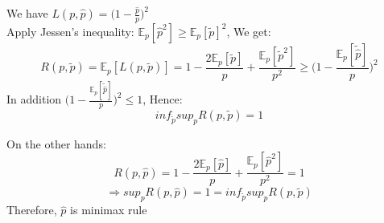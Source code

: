 \documentclass[10pt]{article}
\newenvironment{problem}[2][Problem]{\begin{trivlist}
\item[\hskip \labelsep {\bfseries #1}\hskip \labelsep {\bfseries #2.}]}{\end{trivlist}}
\begin{document}
\begin{problem}{5}
We have $L(p, \hat{p})=\big(1-\frac{\hat{p}}{p} \big)^2$ \\
Apply Jessen's inequality: $ \mathbb{E}_p[\hat{p} ^2] \geq {\mathbb{E}_p [\tilde{p}]}^2$, We get:
\[R(p, \tilde{p})=\mathbb{E}_{p}[L(p, \tilde{p})]=1-\frac{2\mathbb{E}_p[\tilde{p}]}{p}+\frac{{\mathbb{E}_p [\tilde{p}^2]}}{p^2} \geq \big(1-\frac{\mathbb{E}_p [\tilde\hat{p}]}{p} \big)^2  \] 
In addition $\big(1-\frac{\mathbb{E}_p [\tilde\hat{p}]}{p} \big)^2  \leq 1 $, Hence:
\[ inf_{\tilde{p}} sup_{p}R(p, \tilde{p})= 1\]

On the other hands:
\[R(p, \hat{p})= 1-\frac{2\mathbb{E}_p[\hat{p}]}{p}+\frac{{\mathbb{E}_p [\hat{p}^2]}}{p^2}=1\]
\[ \Rightarrow sup_{p}R(p, \hat{p})=1= inf_{\tilde{p}} sup_{p}R(p, \tilde{p})\]
Therefore, $\hat{p}$ is minimax rule

\end{problem}
\end{document}
